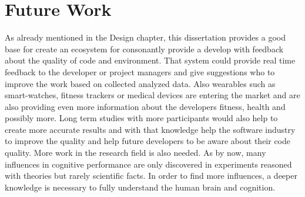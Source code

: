 \section{Future Work}
As already mentioned in the Design chapter, this dissertation provides a good base for create an ecosystem for consonantly provide a develop with feedback about the quality of code and environment. That system could provide real time feedback to the developer or project managers and give suggestions who to improve the work based on collected analyzed data. 
Also wearables such as smart-watches, fitness trackers or medical devices are entering the market and are also providing even more information about the developers fitness, health and possibly more. 
Long term studies with more participants would also help to create more accurate results and with that knowledge help the software industry to improve the quality and help future developers to be aware about their code quality. 
More work in the research field is also needed. As by now, many influences in cognitive performance are only discovered in experiments reasoned with theories but rarely scientific facts. In order to find more influences, a deeper knowledge is necessary to fully understand the human brain and cognition. 

